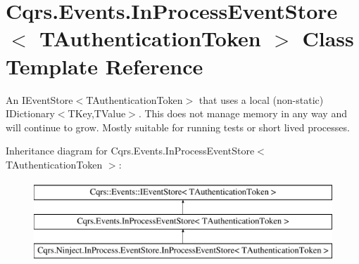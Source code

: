 \hypertarget{classCqrs_1_1Events_1_1InProcessEventStore}{}\section{Cqrs.\+Events.\+In\+Process\+Event\+Store$<$ T\+Authentication\+Token $>$ Class Template Reference}
\label{classCqrs_1_1Events_1_1InProcessEventStore}


An I\+Event\+Store$<$\+T\+Authentication\+Token$>$ that uses a local (non-\/static) I\+Dictionary$<$\+T\+Key,\+T\+Value$>$. This does not manage memory in any way and will continue to grow. Mostly suitable for running tests or short lived processes.  


Inheritance diagram for Cqrs.\+Events.\+In\+Process\+Event\+Store$<$ T\+Authentication\+Token $>$\+:\begin{figure}[H]
\begin{center}
\leavevmode
\includegraphics[height=3.000000cm]{classCqrs_1_1Events_1_1InProcessEventStore}
\end{center}
\end{figure}
